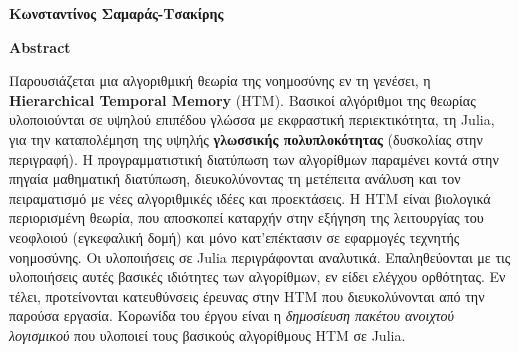 \thispagestyle{plain}
\begin{center}
    \Large
    \textbf{\titlestring}

    \vspace{0.4cm}
    \large

    \vspace{0.4cm}
    \textbf{Κωνσταντίνος Σαμαράς-Τσακίρης}

    \vspace{0.9cm}
    \textbf{Abstract}
\end{center}

Παρουσιάζεται μια αλγοριθμική θεωρία της νοημοσύνης εν τη γενέσει, η \textbf{Hierarchical Temporal Memory} (HTM).
Βασικοί αλγόριθμοι της θεωρίας υλοποιούνται σε υψηλού επιπέδου γλώσσα με εκφραστική περιεκτικότητα, τη Julia,
για την καταπολέμηση της υψηλής \textbf{γλωσσικής πολυπλοκότητας} (δυσκολίας στην περιγραφή).
Η προγραμματιστική διατύπωση των αλγορίθμων παραμένει κοντά στην πηγαία μαθηματική διατύπωση,
διευκολύνοντας τη μετέπειτα ανάλυση και τον πειραματισμό με νέες αλγοριθμικές ιδέες και προεκτάσεις.
Η HTM είναι βιολογικά περιορισμένη θεωρία, που αποσκοπεί καταρχήν στην εξήγηση της λειτουργίας του νεοφλοιού (εγκεφαλική δομή)
και μόνο κατ'επέκτασιν σε εφαρμογές τεχνητής νοημοσύνης.
Οι υλοποιήσεις σε Julia περιγράφονται αναλυτικά.
Επαληθεύονται με τις υλοποιήσεις αυτές βασικές ιδιότητες των αλγορίθμων, εν είδει ελέγχου ορθότητας.
Εν τέλει, προτείνονται κατευθύνσεις έρευνας στην HTM που διευκολύνονται από την παρούσα εργασία.
Κορωνίδα του έργου είναι η \textit{δημοσίευση πακέτου ανοιχτού λογισμικού} που υλοποιεί τους βασικούς αλγορίθμους HTM σε Julia.
